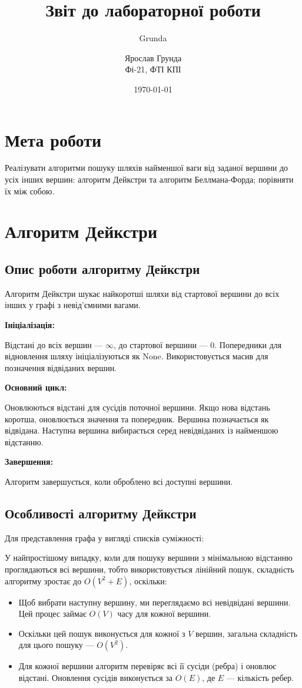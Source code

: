 \documentclass[a4paper,12pt]{article}
\author{Grunda}
\title{Звіт до лабораторної роботи}
\author{Ярослав Грунда \\ Фі-21, ФТІ КПІ}
\date{\today}
\begin{document}
\maketitle

\tableofcontents 
\newpage

\section{Мета роботи}
Реалізувати алгоритми пошуку шляхів найменшої ваги від заданої вершини до усіх інших вершин: 
алгоритм Дейкстри та алгоритм Беллмана-Форда; порівняти їх між собою.

\section{Алгоритм Дейкстри}

\subsection{Опис роботи алгоритму Дейкстри}
Алгоритм Дейкстри шукає найкоротші шляхи від стартової вершини до всіх інших у графі з невід'ємними вагами.

\textbf{Ініціалізація:}

Відстані до всіх вершин — $\infty$, до стартової вершини — $0$.  
Попередники для відновлення шляху ініціалізуються як None.  
Використовується масив для позначення відвіданих вершин.  

\textbf{Основний цикл:}

Оновлюються відстані для сусідів поточної вершини. Якщо нова відстань коротша, оновлюється значення та попередник.  
Вершина позначається як відвідана.  
Наступна вершина вибирається серед невідвіданих із найменшою відстанню.  

\textbf{Завершення:}

Алгоритм завершується, коли оброблено всі доступні вершини.

\subsection{Особливості алгоритму Дейкстри}
Для представлення графа у вигляді списків суміжності:

У найпростішому випадку, коли для пошуку вершини з мінімальною відстанню проглядаються всі вершини, тобто використовується лінійний пошук, складність алгоритму зростає до $O(V^2 + E)$, оскільки:

\begin{itemize}
    \item Щоб вибрати наступну вершину, ми переглядаємо всі невідвідані вершини. Цей процес займає $O(V)$ часу для кожної вершини.
    \item Оскільки цей пошук виконується для кожної з $V$ вершин, загальна складність для цього пошуку — $O(V^2)$.
    \item Для кожної вершини алгоритм перевіряє всі її сусіди (ребра) і оновлює відстані. Оновлення сусідів виконується за $O(E)$, де $E$ — кількість ребер.
\end{itemize}
\end{document}
